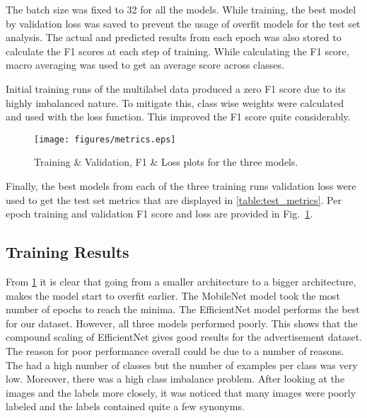 \documentclass[conference]{IEEEtran}
\begin{document}
The batch size was fixed to 32 for all the models. While training, the best model by 
validation loss was saved to prevent the usage of overfit models for the test set analysis. The actual and predicted results from each epoch was also stored to calculate the F1 scores at each step of training. While calculating the F1 score, macro averaging 
was used to get an average score across classes. 

Initial training runs of the multilabel data produced a zero F1 score due to its highly imbalanced nature. To mitigate this, class wise weights were calculated and used with the loss function. This improved the F1 score quite considerably.

\begin{figure}[htbp]
    \centering
    \texttt{[image: figures/metrics.eps]}  
    \caption{Training \& Validation, F1 \& Loss plots for the three models.}
    \label{fig:acc_loss}
  \end{figure}


Finally, the best models from each of the three training runs validation loss were used 
to get the test set metrics that are displayed in \ref{table:test_metrics}. 
Per epoch training and validation F1 score and loss are provided in 
Fig.~\ref{fig:acc_loss}.

\subsection{Training Results}
From \ref{fig:acc_loss} it is clear that going from a smaller 
architecture to a bigger architecture, makes the model start to overfit earlier. 
The MobileNet model took the most number of epochs to reach the minima. The EfficientNet model performs the best for our dataset. However, all three models performed poorly. This shows that the compound scaling of EfficientNet gives good results for the advertisement dataset. The reason for poor performance overall could be due to a number of reasons. 
The had a high number of classes but the number of examples per class was very low.
Moreover, there was a high class imbalance problem. After looking at the images and 
the labels more closely, it was noticed that many images were poorly labeled and the 
labels contained quite a few synonyms. 
\end{document}
